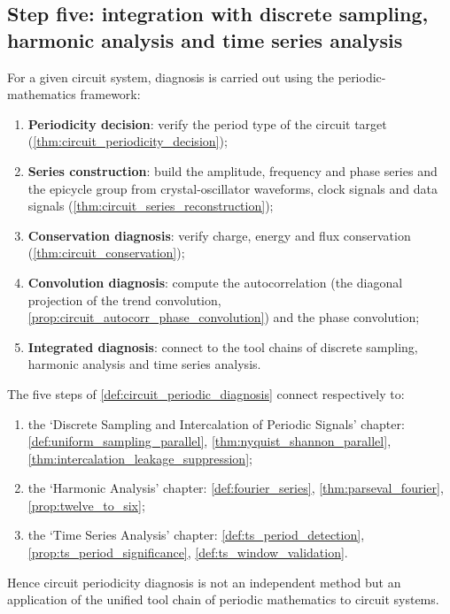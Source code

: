 \subsection{Step five: integration with discrete sampling, harmonic analysis and time series analysis}

\begin{definition}\label{def:circuit_periodic_diagnosis}
For a given circuit system, diagnosis is carried out using the periodic-mathematics framework:
\begin{enumerate}[label=(\roman*)]
    \item \textbf{Periodicity decision}: verify the period type of the circuit target (\cref{thm:circuit_periodicity_decision});
    \item \textbf{Series construction}: build the amplitude, frequency and phase series and the epicycle group from crystal-oscillator waveforms, clock signals and data signals (\cref{thm:circuit_series_reconstruction});
    \item \textbf{Conservation diagnosis}: verify charge, energy and flux conservation (\cref{thm:circuit_conservation});
    \item \textbf{Convolution diagnosis}: compute the autocorrelation (the diagonal projection of the trend convolution, \cref{prop:circuit_autocorr_phase_convolution}) and the phase convolution;
    \item \textbf{Integrated diagnosis}: connect to the tool chains of discrete sampling, harmonic analysis and time series analysis.
\end{enumerate}
\end{definition}

\begin{theorem}\label{thm:circuit_diagnosis_integration}
The five steps of \cref{def:circuit_periodic_diagnosis} connect respectively to:
\begin{enumerate}[label=(\roman*)]
    \item the `Discrete Sampling and Intercalation of Periodic Signals' chapter: \cref{def:uniform_sampling_parallel}, \cref{thm:nyquist_shannon_parallel}, \cref{thm:intercalation_leakage_suppression};
    \item the `Harmonic Analysis' chapter: \cref{def:fourier_series}, \cref{thm:parseval_fourier}, \cref{prop:twelve_to_six};
    \item the `Time Series Analysis' chapter: \cref{def:ts_period_detection}, \cref{prop:ts_period_significance}, \cref{def:ts_window_validation}.
\end{enumerate}
Hence circuit periodicity diagnosis is not an independent method but an application of the unified tool chain of periodic mathematics to circuit systems.
\end{theorem}

